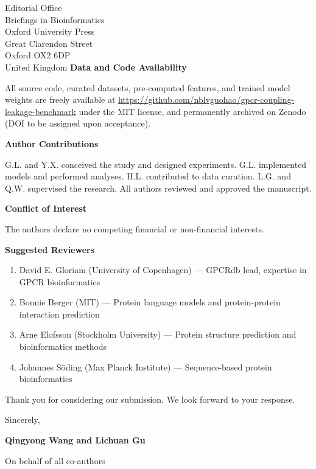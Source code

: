 \documentclass[11pt]{letter}
\begin{document}
\begin{letter}{Editorial Office\\
Briefings in Bioinformatics\\
Oxford University Press\\
Great Clarendon Street\\
Oxford OX2 6DP\\
United Kingdom}
\textbf{Data and Code Availability}

All source code, curated datasets, pre-computed features, and trained model weights are freely available at \url{https://github.com/nblvguohao/gpcr-coupling-leakage-benchmark} under the MIT license, and permanently archived on Zenodo (DOI to be assigned upon acceptance).

\textbf{Author Contributions}

G.L. and Y.X. conceived the study and designed experiments. G.L. implemented models and performed analyses. H.L. contributed to data curation. L.G. and Q.W. supervised the research. All authors reviewed and approved the manuscript.

\textbf{Conflict of Interest}

The authors declare no competing financial or non-financial interests.

\textbf{Suggested Reviewers}

\begin{enumerate}
    \item David E. Gloriam (University of Copenhagen) --- GPCRdb lead, expertise in GPCR bioinformatics
    \item Bonnie Berger (MIT) --- Protein language models and protein-protein interaction prediction
    \item Arne Elofsson (Stockholm University) --- Protein structure prediction and bioinformatics methods
    \item Johannes S\"oding (Max Planck Institute) --- Sequence-based protein bioinformatics
\end{enumerate}

\closing{Thank you for considering our submission. We look forward to your response.}

\vspace{0.5cm}

Sincerely,

\vspace{0.5cm}

\textbf{Qingyong Wang and Lichuan Gu}

On behalf of all co-authors

\end{letter}
\end{document}
